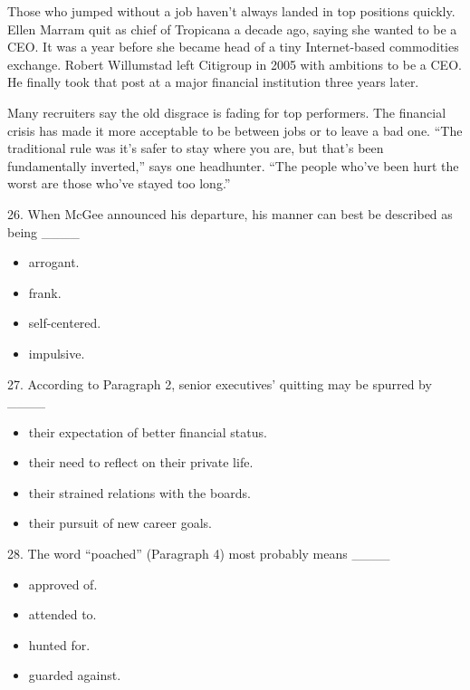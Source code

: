 \documentclass[UTF8,11pt]{ctexart}
\begin{document}
Those who jumped without a job haven't always landed in top positions quickly. Ellen Marram quit as chief of Tropicana a decade ago, saying she wanted to be a CEO. It was a year before she became head of a tiny Internet-based commodities exchange. Robert Willumstad left Citigroup in 2005 with ambitions to be a CEO. He finally took that post at a major financial institution three years later.


Many recruiters say the old disgrace is fading for top performers. The financial crisis has made it more acceptable to be between jobs or to leave a bad one. “The traditional rule was it's safer to stay where you are, but that's been fundamentally inverted,” says one headhunter. “The people who've been hurt the worst are those who've stayed too long.”


26. When McGee announced his departure, his manner can best be described as being \_\_\_\_


\begin{itemize}[leftmargin=2em,itemsep=.2em,topsep=.4em]\item[A.] arrogant.
\item[B.] frank.
\item[C.] self-centered.
\item[D.] impulsive.
\end{itemize}

27. According to Paragraph 2, senior executives' quitting may be spurred by \_\_\_\_


\begin{itemize}[leftmargin=2em,itemsep=.2em,topsep=.4em]\item[A.] their expectation of better financial status.
\item[B.] their need to reflect on their private life.
\item[C.] their strained relations with the boards.
\item[D.] their pursuit of new career goals.
\end{itemize}

28. The word “poached” (Paragraph 4) most probably means \_\_\_\_


\begin{itemize}[leftmargin=2em,itemsep=.2em,topsep=.4em]\item[A.] approved of.
\item[B.] attended to.
\item[C.] hunted for.
\item[D.] guarded against.
\end{itemize}
\end{document}
